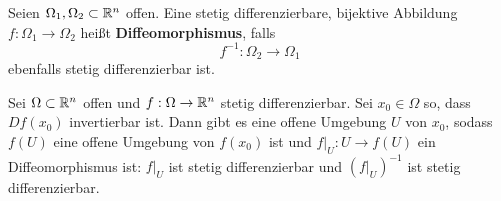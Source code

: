 \begin{definition}
	Seien $ \Omega_1, \Omega_2 \subset \mathbb{R} ^n $ offen.
	Eine stetig differenzierbare, bijektive Abbildung $ f: \Omega_1 \to \Omega_2 $ heißt \textbf{Diffeomorphismus}, falls 
	\[
		f^{-1} : \Omega_2 \to \Omega_1
	\]
	ebenfalls stetig differenzierbar ist.
\end{definition}

\begin{theorem}
	Sei $ \Omega \subset \mathbb{R} ^n $ offen und $ f: \Omega \to \mathbb{R} ^n $ stetig differenzierbar.
	Sei $ x_0 \in \Omega $ so, dass $ Df(x_0) $ invertierbar ist.
	Dann gibt es eine offene Umgebung $ U $ von $ x_0 $, sodass $ f(U) $ eine offene Umgebung von $ f(x_0) $ ist und $ f|_U : U \to f(U) $ ein Diffeomorphismus ist: $ f|_U $ ist stetig differenzierbar und $ \left( f|_{U} \right)^{-1}  $ ist stetig differenzierbar.
\end{theorem}
